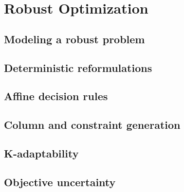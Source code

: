 \part{Robust Optimization}

\chapter{Modeling a robust problem}
\label{chapter:robust:modeling}


\chapter{Deterministic reformulations}

\chapter{Affine decision rules}

\chapter{Column and constraint generation}


\chapter{K-adaptability}

\chapter{Objective uncertainty}